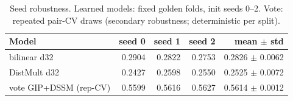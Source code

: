\begin{table}[t]
\centering
\small
\caption{Seed robustness. Learned models: fixed golden folds, init seeds 0--2. Vote: repeated pair-CV draws (secondary robustness; deterministic per split).}
\label{tab:seeds}
\begin{tabular}{@{}lrrrr@{}}
\toprule
Model & seed 0 & seed 1 & seed 2 & mean $\pm$ std \\
\midrule
bilinear d32 & 0.2904 & 0.2822 & 0.2753 & 0.2826 $\pm$ 0.0062 \\
DistMult d32 & 0.2427 & 0.2598 & 0.2550 & 0.2525 $\pm$ 0.0072 \\
vote GIP+DSSM (rep-CV) & 0.5599 & 0.5616 & 0.5627 & 0.5614 $\pm$ 0.0012 \\
\bottomrule
\end{tabular}
\end{table}

